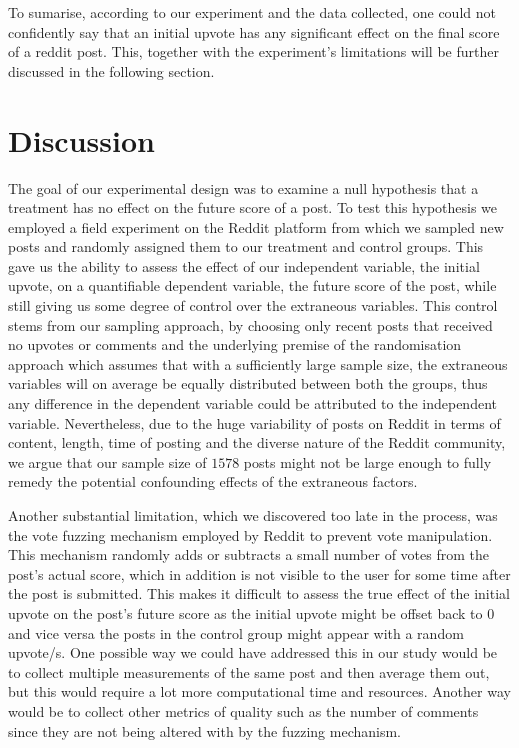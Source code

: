 \documentclass[fleqn,12pt]{article}
\begin{document}
To sumarise, according to our experiment and the data collected, one
could not confidently say that an initial upvote has any significant effect on the final 
score of a reddit post. This, together
with the experiment's limitations will be further discussed 
in the following section.

\section{Discussion}

The goal of our experimental design was to examine a null hypothesis
that a treatment has no effect on the future score of a post. To
test this hypothesis we employed a field experiment on the Reddit platform from which
we sampled new posts and randomly assigned them to our treatment and control groups.
This gave us the ability to assess the effect of our independent variable, the initial upvote,
on a quantifiable dependent variable, the future score of the post, while
still giving us some degree of control over the extraneous variables. 
This control stems from our sampling approach, by choosing
only recent posts that received no upvotes or comments and
the underlying premise of the randomisation approach which assumes
that with a sufficiently large sample size, the extraneous variables
will on average be equally distributed between both the groups, thus any
difference in the dependent variable could be attributed to the independent variable.
Nevertheless, due to the huge variability of posts on Reddit in terms
of content, length, time of posting and the diverse nature of the Reddit community,
we argue that our sample size of $1578$ posts might not be large enough to
fully remedy the potential confounding effects of the extraneous factors.

Another substantial limitation, which we discovered too late in the process,
was the vote fuzzing mechanism employed by Reddit to prevent vote manipulation. This mechanism
randomly adds or subtracts a small number of votes from the post's actual score, which in addition
is not visible to the user for some time after the post is submitted.
This makes it difficult to assess the true effect of the initial upvote
on the post's future score as the initial upvote might be offset back to $0$ and vice versa
the posts in the control group might appear with a random upvote/s. One possible way
we could have addressed this in our study would be to collect multiple measurements of the same post
and then average them out, but this would require a lot more computational time
and resources. Another way would be to collect other metrics of quality such as the number of comments
since they are not being altered with by the fuzzing mechanism.
\end{document}
